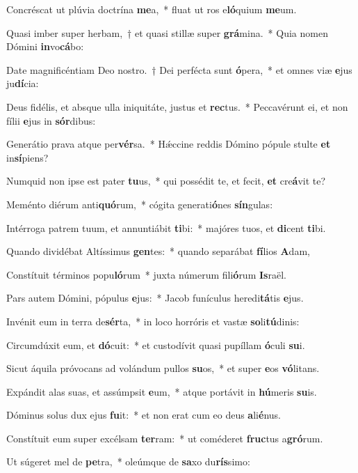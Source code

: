 \item Concréscat ut plúvia doctrína \textbf{me}a,~* fluat ut ros e\textbf{ló}quium \textbf{me}um.
\item Quasi imber super herbam,~† et quasi stillæ super \textbf{grá}mina.~* Quia nomen Dómini \textbf{in}vo\textbf{cá}bo:
\item Date magnificéntiam Deo nostro.~† Dei perfécta sunt \textbf{ó}pera,~* et omnes viæ \textbf{e}jus ju\textbf{dí}cia:
\item Deus fidélis, et absque ulla iniquitáte, justus et \textbf{rec}tus.~* Peccavérunt ei, et non fílii \textbf{e}jus in \textbf{sór}dibus:
\item Generátio prava atque per\textbf{vér}sa.~* Hǽccine reddis Dómino pópule stulte \textbf{et} in\textbf{sí}piens?
\item Numquid non ipse est pater \textbf{tu}us,~* qui possédit te, et fecit, \textbf{et} cre\textbf{á}vit te?
\item Meménto diérum anti\textbf{quó}rum,~* cógita generati\textbf{ó}nes \textbf{sín}gulas:
\item Intérroga patrem tuum, et annuntiábit \textbf{ti}bi:~* majóres tuos, et \textbf{di}cent \textbf{ti}bi.
\item Quando dividébat Altíssimus \textbf{gen}tes:~* quando separábat \textbf{fí}lios \textbf{A}dam,
\item Constítuit términos popu\textbf{ló}rum~* juxta númerum fili\textbf{ó}rum \textbf{Is}raël.
\item Pars autem Dómini, pópulus \textbf{e}jus:~* Jacob funículus heredi\textbf{tá}tis \textbf{e}jus.
\item Invénit eum in terra de\textbf{sér}ta,~* in loco horróris et vastæ \textbf{so}li\textbf{tú}dinis:
\item Circumdúxit eum, et \textbf{dó}cuit:~* et custodívit quasi pupíllam \textbf{ó}culi \textbf{su}i.
\item Sicut áquila próvocans ad volándum pullos \textbf{su}os,~* et super \textbf{e}os \textbf{vó}litans.
\item Expándit alas suas, et assúmpsit \textbf{e}um,~* atque portávit in \textbf{hú}meris \textbf{su}is.
\item Dóminus solus dux ejus \textbf{fu}it:~* et non erat cum eo deus \textbf{a}li\textbf{é}nus.
\item Constítuit eum super excélsam \textbf{ter}ram:~* ut coméderet \textbf{fruc}tus a\textbf{gró}rum.
\item Ut súgeret mel de \textbf{pe}tra,~* oleúmque de \textbf{sa}xo du\textbf{rís}simo:
